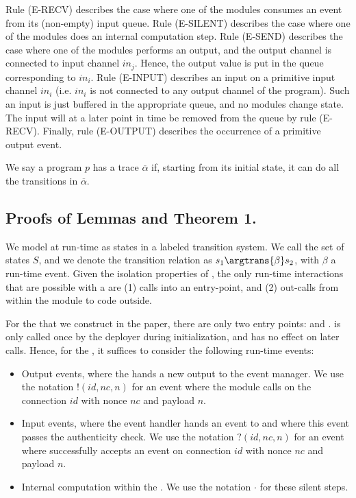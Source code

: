 Rule (E-RECV) describes the case where one of the modules consumes an event from its (non-empty) input queue. Rule (E-SILENT) describes the case where one of the modules
does an internal computation step. Rule (E-SEND) describes the case where one of the modules performs an output, and the output channel is connected to input channel $in_j$.
Hence, the output value is put in the queue corresponding to $in_i$. Rule (E-INPUT) describes an input on a primitive input channel $in_i$ (i.e. $in_i$ is not connected to any
output channel of the program). Such an input is just buffered in the appropriate queue, and no modules change state. The input will at a later point in time be removed from the
queue by rule (E-RECV). Finally, rule (E-OUTPUT) describes the occurrence of a primitive output event.

We say a program $p$ has a trace $\overline{\alpha}$ if, starting from its initial state, it can do all the transitions in $\overline{\alpha}$.


\subsection{Proofs of Lemmas and Theorem 1.}
\label{sec:proofs}

We model \protmods{} at run-time as states in a labeled transition system. We call the set of states $S$, and we denote the transition relation as
$s_1 \argtrans{\beta} s_2$, with $\beta$ a run-time event. Given the
isolation properties of \protmods{}, the only run-time interactions that are possible
with a \protmod{} are (1) calls into an entry-point, and (2) out-calls from within the module to code outside.

For the \protmods{} that we construct in the paper, there are only two entry points: \setkey{} and \handleinput. \setkey{} is only called once by
the deployer during initialization, and has no effect on later calls. Hence, for the \protmods{},
it suffices to consider the following run-time events:
\begin{itemize}
\item Output events, where the \protmod{} hands a new output to the event manager. We use the notation $!(id,nc,n)$ for  an event where the module calls \handleoutput{} on
the connection $id$ with nonce $nc$ and payload $n$.
\item Input events, where the event handler hands an event to \handleinput{} and where this event passes the authenticity check. We use the notation $?(id,nc,n)$ for an event where
\handleinput{} successfully accepts an event on connection $id$ with nonce $nc$ and payload $n$.
\item Internal computation within the \protmod{}. We use the notation $\cdot$ for these silent steps.
\end{itemize}

